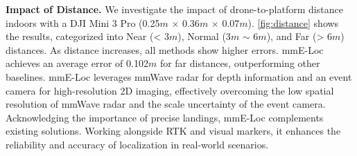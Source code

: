 
\textbf{Impact of Distance.}
We investigate the impact of drone-to-platform distance indoors with a DJI Mini 3 Pro (0.25$m$ $\times$ 0.36$m$ $\times$ 0.07$m$). 
\fig \ref{fig:distance} shows the results, categorized into Near (< 3$m$), Normal (3$m$ $\sim$ 6$m$), and Far (> 6$m$) distances. 
As distance increases, all methods show higher errors. 
mmE-Loc achieves an average error of 0.102$m$ for far distances, outperforming other baselines. 
mmE-Loc leverages mmWave radar for depth information and an event camera for high-resolution 2D imaging, effectively overcoming the low spatial resolution of mmWave radar and the scale uncertainty of the event camera.
Acknowledging the importance of precise landings, mmE-Loc complements existing solutions.
Working alongside RTK and visual markers, it enhances the reliability and accuracy of localization in real-world scenarios.


